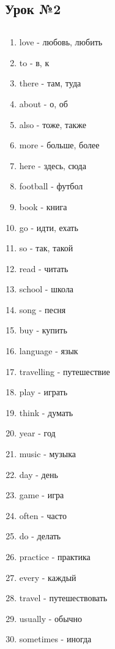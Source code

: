 \subsection{Урок №2}

\subsection*{}
\begin{multicols}{2}
    \begin{enumerate}\setlength{\itemsep}{0pt}
        \item love - любовь, любить
        \item to - в, к
        \item there - там, туда
        \item about - о, об
        \item also - тоже, также
        \item more - больше, более
        \item here - здесь, сюда
        \item football - футбол
        \item book - книга
        \item go - идти, ехать
        \item so - так, такой
        \item read - читать
        \item school - школа
        \item song - песня
        \item buy - купить
        \item language - язык
        \item travelling - путешествие
        \item play - играть
        \item think - думать
        \item year - год
        \item music - музыка
        \item day - день
        \item game - игра
        \item often - часто
        \item do - делать
        \item practice - практика
        \item every - каждый
        \item travel - путешествовать
        \item usually - обычно
        \item sometimes - иногда

\end{enumerate}
\end{multicols}
